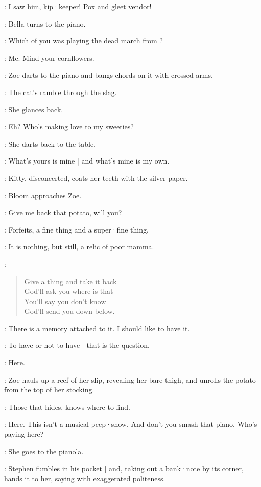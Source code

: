 \Bloom:
I saw him,
kip·keeper!
Pox and gleet vendor!

:
Bella turns to the piano.

\Bella:
Which of you was playing the dead march from ?

\Zoe[1]:
Me.
Mind your cornflowers.

:
Zoe darts to the piano and bangs chords on it with crossed arms.

\Zoe:
The cat's ramble through the slag.

:
She glances back.

\Zoe:
Eh?
Who's making love to my sweeties?

:
She darts back to the table.

\Zoe:
What's yours is mine |
and what's mine is my own.

:
Kitty,
disconcerted,
coats her teeth with the silver paper.

:
Bloom approaches Zoe.

\Bloom:
Give me back that potato,
will you?

\Zoe:
Forfeits,
a fine thing and a super·fine thing.

\Bloom:
It is nothing,
but still,
a relic of poor mamma.

\Zoe:
\begin{verse}
    Give a thing and take it back\\
    God'll ask you where is that\\
    You'll say you don't know\\
    God'll send you down below.
\end{verse}

\Bloom:
There is a memory attached to it.
%
I should like to have it.

\Stephen[1]:
To have or not to have |
that is the question.

\Zoe:
Here.

:
Zoe hauls up a reef of her slip,
revealing her bare thigh,
and unrolls the potato from the top of her stocking.

\Zoe:
Those that hides,
knows where to find.

\Bella:
Here.
This isn't a musical peep·show.
And don't you smash that piano.
Who's paying here?

:
She goes to the pianola.

:
Stephen fumbles in his pocket |
and,
taking out a bank·note by its corner,
hands it to her,
saying with exaggerated politeness.

